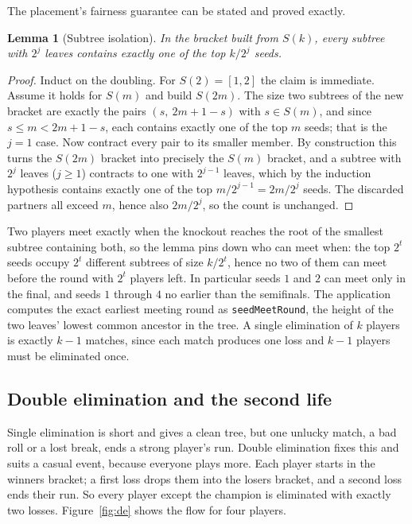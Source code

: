 \documentclass[11pt]{article}
\newtheorem{lemma}{Lemma}
\begin{document}
The placement's fairness guarantee can be stated and proved exactly.

\begin{lemma}[Subtree isolation]
In the bracket built from $S(k)$, every subtree with $2^j$ leaves contains exactly
one of the top $k/2^j$ seeds.
\end{lemma}

\begin{proof}
Induct on the doubling. For $S(2) = [1,2]$ the claim is immediate. Assume it holds
for $S(m)$ and build $S(2m)$. The size two subtrees of the new bracket are exactly
the pairs $(s,\ 2m+1-s)$ with $s \in S(m)$, and since $s \le m < 2m+1-s$, each
contains exactly one of the top $m$ seeds; that is the $j=1$ case. Now contract
every pair to its smaller member. By construction this turns the $S(2m)$ bracket
into precisely the $S(m)$ bracket, and a subtree with $2^j$ leaves ($j \ge 1$)
contracts to one with $2^{j-1}$ leaves, which by the induction hypothesis contains
exactly one of the top $m/2^{j-1} = 2m/2^j$ seeds. The discarded partners all
exceed $m$, hence also $2m/2^j$, so the count is unchanged.
\end{proof}

Two players meet exactly when the knockout reaches the root of the smallest
subtree containing both, so the lemma pins down who can meet when: the top $2^t$
seeds occupy $2^t$ different subtrees of size $k/2^t$, hence no two of them can
meet before the round with $2^t$ players left. In particular seeds $1$ and $2$ can
meet only in the final, and seeds $1$ through $4$ no earlier than the semifinals.
The application computes the exact earliest meeting round as
\texttt{seedMeetRound}, the height of the two leaves' lowest common ancestor in
the tree. A single elimination of $k$ players is exactly $k-1$ matches, since each
match produces one loss and $k-1$ players must be eliminated once.

\subsection{Double elimination and the second life}

Single elimination is short and gives a clean tree, but one unlucky match, a bad
roll or a lost break, ends a strong player's run. Double elimination fixes this and
suits a casual event, because everyone plays more. Each player starts in the
winners bracket; a first loss drops them into the losers bracket, and a second loss
ends their run. So every player except the champion is eliminated with exactly two
losses. Figure~\ref{fig:de} shows the flow for four players.
\end{document}

